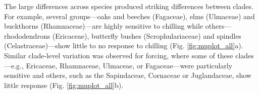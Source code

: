 \documentclass[11pt]{article}
\begin{document}
The large differences across species produced striking differences between clades. For example, several groups---oaks and
beeches (Fagaceae), elms (Ulmaceae) and buckthorns (Rhamnaceae)---are highly sensitive to chilling while others---rhododendrons (Ericaceae), butterfly bushes (Scrophulariaceae) and spindles (Celastraceae)---show little to no response to chilling  (Fig. \ref{fig:muplot_all}a). %
Similar clade-level variation was observed for forcing, where some of these clades---e.g., Ericaceae, Rhamnaceae, Ulmaceae, or Fagaceae---were particularly sensitive and others, such as the Sapindaceae, Cornaceae or Juglandaceae, show little response (Fig. \ref{fig:muplot_all}b). %
\end{document}
